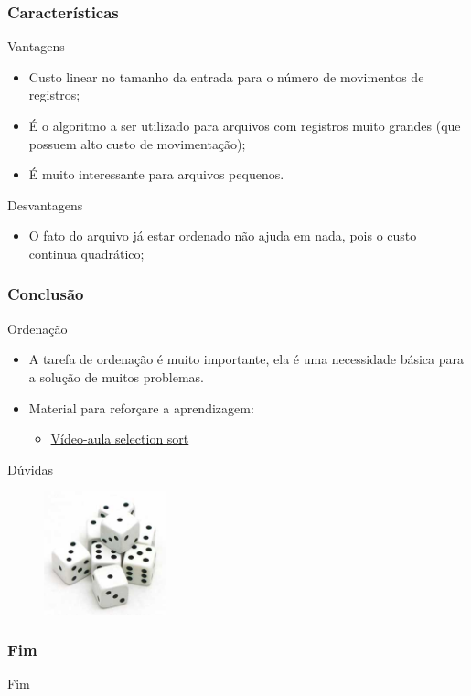 \documentclass[aspectratio=169]{beamer}
\begin{document}

\begin{frame}
\frametitle{Características}
\begin{block}{Vantagens}
  \begin{itemize}
  \item Custo linear no tamanho da entrada para o número de movimentos de registros;
  \item É o algoritmo a ser utilizado para arquivos com registros muito grandes (que possuem alto custo de movimentação);
  \item É muito interessante para arquivos pequenos.
  \end{itemize}
\end{block}
\begin{block}{Desvantagens}
  \begin{itemize}
  \item O fato do arquivo já estar ordenado não ajuda em nada, pois o custo continua quadrático;
  \end{itemize} 
\end{block}
\end{frame}


\begin{frame}
\frametitle{Conclusão}
\begin{block}{Ordenação}
  \begin{itemize}
   \item A tarefa de ordenação é muito importante, ela é uma necessidade básica para a solução de muitos problemas.
   \item Material para reforçare a aprendizagem:
      \begin{itemize}
       \item \href{https://www.youtube.com/watch?v=zjcGGqskf5s}{Vídeo-aula selection sort}
      \end{itemize}

  \end{itemize}  
\end{block}
\end{frame}


\begin{frame}
\Huge{\centerline{Dúvidas}}

\begin{figure}[!h]
  \centering
  \includegraphics[width=100pt]{imgs/dados.jpg}
  \label{fig_fim}
\end{figure}

\end{frame}



\begin{frame}
  \frametitle{Fim}
\begin{center}
\Huge Fim
\end{center}
\end{frame}
\end{document}
